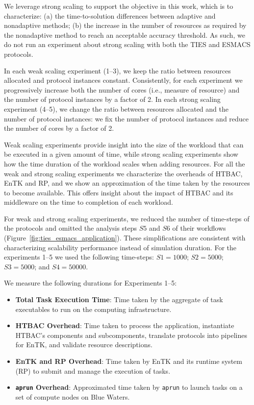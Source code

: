 We leverage strong scaling to support the objective in this work, which is to
characterize: (a) the time-to-solution differences between adaptive and
nonadaptive methods; (b) the increase in the number of resources as required
by the nonadaptive method to reach an acceptable accuracy threshold. As such,
we do not run an experiment about strong scaling with both the TIES and
ESMACS protocols.

In each weak scaling experiment (1--3), we keep the ratio between resources
allocated and protocol instances constant. Consistently, for each experiment
we progressively increase both the number of cores (i.e., measure of
resource) and the number of protocol instances by a factor of 2. In each
strong scaling experiment (4--5), we change the ratio between resources
allocated and the number of protocol instances: we fix the number of protocol
instances and reduce the number of cores by a factor of 2.

Weak scaling experiments provide insight into the size of the workload that
can be executed in a given amount of time, while strong scaling experiments
show how the time duration of the workload scales when adding resources. For
all the weak and strong scaling experiments we characterize the overheads of
HTBAC, EnTK and RP, and we show an approximation of the time taken by the
resources to become available. This offers insight about the impact of HTBAC
and its middleware on the time to completion of each workload.

For weak and strong scaling experiments, we reduced the number of time-steps
of the protocols and omitted the analysis steps $S5$ and $S6$ of their
workflows (Figure~\ref{fig:ties_esmacs_application}). These simplifications
are consistent with characterizing scalability performance instead of
simulation duration. For the experiments 1--5 we used the following
time-steps: $S1=1000$; $S2=5000$; $S3=5000$; and $S4=50000$.

We measure the following durations for Experiments 1--5:

\begin{itemize}
    \item \textbf{Total Task Execution Time}: Time taken by the
    aggregate of task executables to run on the computing infrastructure.
    
    \item \textbf{HTBAC Overhead}: Time taken to process the application,
    instantiate HTBAC's components and subcomponents, translate protocols
    into pipelines for EnTK, and validate resource descriptions.
    
    \item \textbf{EnTK and RP Overhead}: Time taken by EnTK and its runtime
    system (RP) to submit and manage the execution of tasks.
    
    \item \textbf{\texttt{aprun} Overhead}: Approximated time taken by 
    \texttt{aprun} to launch tasks on a set of compute nodes on Blue Waters.
\end{itemize}

